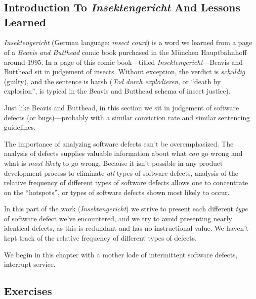 
\chapter{\cirdzerolongtitle{}}

\label{cird0}

\section{Introduction To \emph{Insektengericht} And Lessons Learned}

\emph{Insektengericht}
(German language:  \emph{insect court}) is a word
we learned from a page of a \emph{Beavis and Butthead}
comic book purchased
in the M\"unchen Hauptbahnhoff around 1995.  In a page of this comic
book---titled \emph{Insektengericht}---Beavis and Butthead sit in judgement
of insects.  Without exception, the verdict is
\emph{schuldig} (guilty), and the sentence is harsh
(\emph{Tod durch explodieren}, or ``death by explosion'', is typical in the
Beavis and Butthead schema of insect justice).

Just like Beavis and Butthead, in this section we sit in judgement of software
defects (or bugs)---probably with a similar conviction rate and similar
sentencing guidelines.

The importance of analyzing software defects can't be overemphasized.
The analysis of defects supplies valuable information about what 
\emph{can} go wrong and what is \emph{most likely} to go wrong.
Because it isn't possible in any product development
process to eliminate \emph{all} types of
software defects, analysis of the relative frequency
of different types of software defects allows
one to concentrate on the ``hotspots'', or types of
software defects shown most likely to occur.

In this part of the work (\emph{Insektengericht}) we strive
to present each different \emph{type} of software defect we've
encountered, and we try to avoid presenting nearly
identical defects, as this is redundant and has no 
instructional value.  We haven't kept track of 
the relative frequency of different types of defects.

We begin in this chapter with a mother lode of intermittent software defects, 
interrupt service.


\section{Exercises}


